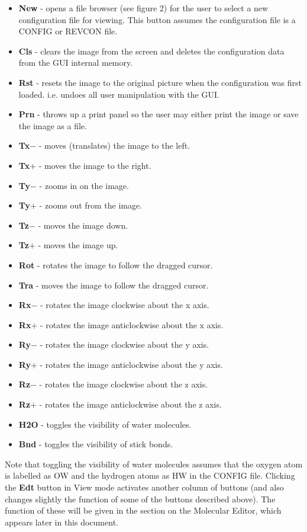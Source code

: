 \begin{itemize}
\item {\bf New} - opens a file browser (see figure 2)
for the user to select a new configuration file for viewing. This
button assumes the configuration file is a \DD{} CONFIG or REVCON
file.
\item {\bf Cls} - clears the image from the screen and deletes the
configuration data from the GUI internal memory.
\item {\bf Rst} - resets the image to the original picture when the
configuration was first loaded. i.e. undoes all user manipulation with
the GUI.
\item {\bf Prn} - throws up a print panel so the user may either print
the image or save the image as a file.
\item {\bf Tx$-$} - moves (translates) the image to the left.
\item {\bf Tx$+$} - moves the image to the right.
\item {\bf Ty$-$} - zooms in on the image.
\item {\bf Ty$+$} - zooms out from the image.
\item {\bf Tz$-$} - moves the image down.
\item {\bf Tz$+$} - moves the image up.
\item {\bf Rot} - rotates the image to follow the dragged cursor.
\item {\bf Tra} - moves the image to follow the dragged cursor.
\item {\bf Rx$-$} - rotates the image clockwise about the x axis.
\item {\bf Rx$+$} - rotates the image anticlockwise about the x axis.
\item {\bf Ry$-$} - rotates the image clockwise about the y axis.
\item {\bf Ry$+$} - rotates the image anticlockwise about the y axis.
\item {\bf Rz$-$} - rotates the image clockwise about the z axis.
\item {\bf Rz$+$} - rotates the image anticlockwise about the z axis.
\item {\bf H2O} - toggles the visibility of water molecules.
\item {\bf Bnd} - toggles the visibility of stick bonds.
\end{itemize}

Note that toggling the visibility of water molecules assumes that the oxygen
atom is labelled as OW and the hydrogen atoms as HW in the CONFIG file.
Clicking the {\bf Edt} button in View mode activates another column of buttons
(and also changes slightly the function of some of the buttons described
above). The function of these will be given in the section on the Molecular
Editor, which appears later in this document.

